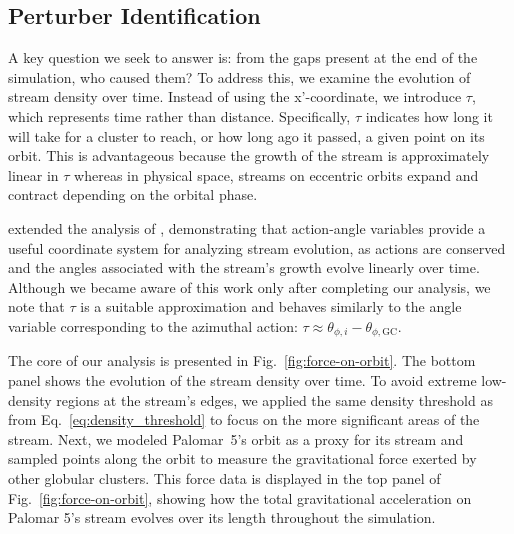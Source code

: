 \documentclass{aa}
\begin{document}
\begin{appendix}
  \section{Perturber Identification} \label{sec:Perturber_Identification}

    A key question we seek to answer is: from the gaps present at the end of the simulation, who caused them? To address this, we examine the evolution of stream density over time. Instead of using the x'-coordinate, we introduce $\tau$, which represents time rather than distance. Specifically, $\tau$ indicates how long it will take for a cluster to reach, or how long ago it passed, a given point on its orbit. This is advantageous because the growth of the stream is approximately linear in $\tau$ whereas in physical space, streams on eccentric orbits expand and contract depending on the orbital phase.


    \citet{2016MNRAS.457.3817S} extended the analysis of \citet{2015MNRAS.450.1136E}, demonstrating that action-angle variables provide a useful coordinate system for analyzing stream evolution, as actions are conserved and the angles associated with the stream's growth evolve linearly over time. Although we became aware of this work only after completing our analysis, we note that $\tau$ is a suitable approximation and behaves similarly to the angle variable corresponding to the azimuthal action: $\tau \approx \theta_{\phi,i} - \theta_{\phi,\text{GC}}$.

    The core of our analysis is presented in Fig.~\ref{fig:force-on-orbit}. The bottom panel shows the evolution of the stream density over time. To avoid extreme low-density regions at the stream's edges, we applied the same density threshold as from Eq.~\ref{eq:density_threshold} to focus on the more significant areas of the stream. Next, we modeled Palomar~5's orbit as a proxy for its stream and sampled points along the orbit to measure the gravitational force exerted by other globular clusters. This force data is displayed in the top panel of Fig.~\ref{fig:force-on-orbit}, showing how the total gravitational acceleration on Palomar 5's stream evolves over its length throughout the simulation.


\end{appendix}
\end{document}
